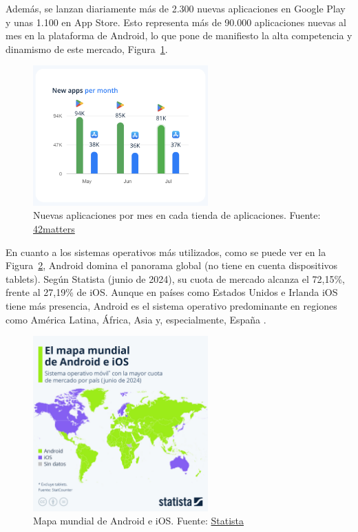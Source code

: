 Además, se lanzan diariamente más de 2.300 nuevas aplicaciones en Google Play y unas 1.100 en App Store. Esto representa más de 90.000 aplicaciones nuevas al mes en la plataforma de Android, lo que pone de manifiesto la alta competencia y dinamismo de este mercado, Figura~\ref{fig:apps_per_month}.

\begin{figure}[H]
\centering
\includegraphics[width=0.6\textwidth]{./img/intro/apps_per_month.png}
\caption{Nuevas aplicaciones por mes en cada tienda de aplicaciones. Fuente: \href{https://42matters.com/stats\#apps-by-category}{42matters}}
\label{fig:apps_per_month}
\end{figure}

En cuanto a los sistemas operativos más utilizados, como se puede ver en la Figura~\ref{fig:world_map_ios_android}, Android domina el panorama global (no tiene en cuenta dispositivos tablets). Según Statista (junio de 2024), su cuota de mercado alcanza el 72,15\%, frente al 27,19\% de iOS. Aunque en países como Estados Unidos e Irlanda iOS tiene más presencia, Android es el sistema operativo predominante en regiones como América Latina, África, Asia y, especialmente, España \cite{android-ios-map}.

\begin{figure}[H]
\centering
\includegraphics[width=0.6\textwidth]{./img/intro/world_map_ios_android.jpeg}
\caption{Mapa mundial de Android e iOS.  Fuente: \href{https://www.statista.com}{Statista}}
\label{fig:world_map_ios_android}
\end{figure}


